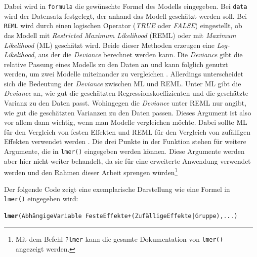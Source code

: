\documentclass[12pt]{article}\usepackage[]{graphicx}\usepackage[]{color}
\makeatletter
\newcommand{\hlkwd}[1]{\textcolor[rgb]{0.737,0.353,0.396}{\textbf{#1}}}%
\newenvironment{kframe}{%
 \def\at@end@of@kframe{}%
 \ifinner\ifhmode%
  \def\at@end@of@kframe{\end{minipage}}%
  \begin{minipage}{\columnwidth}%
 \fi\fi%
 \def\FrameCommand##1{\hskip\@totalleftmargin \hskip-\fboxsep
 \colorbox{shadecolor}{##1}\hskip-\fboxsep
     \hskip-\linewidth \hskip-\@totalleftmargin \hskip\columnwidth}%
 \MakeFramed {\advance\hsize-\width
   \@totalleftmargin\z@ \linewidth\hsize
   \@setminipage}}%
 {\par\unskip\endMakeFramed%
 \at@end@of@kframe}
\newenvironment{knitrout}{}{} %
\makeatother
\begin{document}
Dabei wird in \texttt{formula} die gewünschte Formel des Modells eingegeben. Bei \texttt{data} wird der Datensatz festgelegt, der anhand das Modell geschätzt werden soll. Bei \texttt{REML} wird durch einen logischen Operator (\textit{TRUE} oder \textit{FALSE}) eingestellt, ob das Modell mit \textit{Restricted Maximum Likelihood} (REML) oder mit \textit{Maximum Likelihood} (ML) geschätzt wird. Beide dieser Methoden erzeugen eine \textit{Log-Likelihood}, aus der die \textit{Deviance} berechnet werden kann. Die \textit{Deviance} gibt die relative Passung eines Modells zu den Daten an und kann folglich genutzt werden, um zwei Modelle miteinander zu vergleichen \citep{SnijdersTomA.B2012Ma:a}. Allerdings unterscheidet sich die Bedeutung der \textit{Deviance} zwischen ML und REML. Unter ML gibt die \textit{Deviance} an, wie gut die geschätzten Regressionskoeffizienten und die geschätzte Varianz zu den Daten passt. Wohingegen die \textit{Deviance} unter REML nur angibt, wie gut die geschätzten Varianzen zu den Daten passen. Dieses Argument ist also vor allem dann wichtig, wenn man Modelle vergleichen möchte. Dabei sollte ML für den Vergleich von festen Effekten und REML für den Vergleich von zufälligen Effekten verwendet werden \citep{PEUGH201085}. Die drei Punkte in der Funktion stehen für weitere Argumente, die in \texttt{lmer()} eingegeben werden können. Diese Argumente werden aber hier nicht weiter behandelt, da sie für eine erweiterte Anwendung verwendet werden und den Rahmen dieser Arbeit sprengen würden\footnote{Mit dem Befehl \texttt{?lmer} kann die gesamte Dokumentation von \texttt{lmer()} angezeigt werden.}

Der folgende Code zeigt eine exemplarische Darstellung wie eine Formel in \texttt{lmer()} eingegeben wird:

\singlespacing
\begin{knitrout}
\color{fgcolor}\begin{kframe}
\begin{alltt}
\hlkwd{lmer}(Abhängige Variable ~ Feste Effekte + (Zufällige Effekte | Gruppe),...)
\end{alltt}
\end{kframe}
\end{knitrout}
\end{document}
